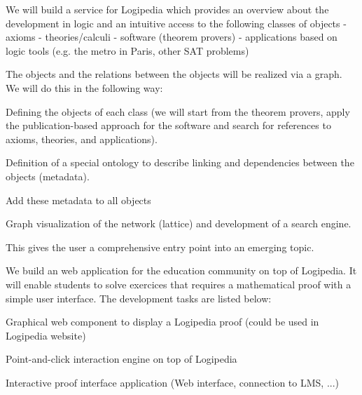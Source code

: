 \begin{workpackage}[id=dissemination,type=MGT,
  short={Dissemination, communication and exploitation},
  title={Dissemination, communication and exploitation},
  lead=Inr]
\begin{tasklist}
  \begin{task}[id=zib,
      title=Linking scientific publications to Logipedia,
      lead=Zib,ZibRM=12]
    We will build a service for Logipedia which provides an overview
    about the development in logic and an intuitive access to the
    following classes of objects - axioms - theories/calculi -
    software (theorem provers) - applications based on logic tools
    (e.g. the metro in Paris, other SAT problems)

    The objects and the relations between the objects will be
    realized via a graph. We will do this in the following way:
    \begin{compactitem}
    \item Defining the objects of each class (we will start from the
      theorem provers, apply the publication-based approach for the
      software and search for references to axioms, theories, and
      applications).
    \item Definition of a special ontology to describe linking and
      dependencies between the objects (metadata).
    \item Add these metadata to all objects
    \item Graph visualization of the network (lattice) and development
      of a search engine.
    \end{compactitem}
    This gives the user a comprehensive entry point into an emerging
    topic.
  \end{task}

  \begin{task}[id=edukera,
      title=Web interface for doing proofs at school,
      lead=Edu,EduRM=12]
    We build an web application for the education community on top of Logipedia. It will
    enable students to solve exercices that requires a mathematical proof with a simple
    user interface.
    The development tasks are listed below:
    \begin{compactitem}
    \item Graphical web component to display a Logipedia proof (could be used in Logipedia website)
    \item Point-and-click interaction engine on top of Logipedia
    \item Interactive proof interface application (Web interface, connection to LMS, ...)
    \end{compactitem}
  \end{task}


\end{tasklist}
\end{workpackage}
